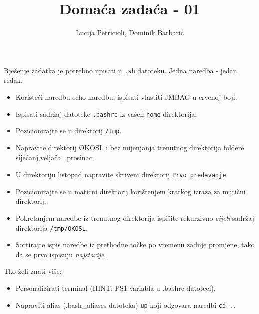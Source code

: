 \documentclass[12pt,a4paper]{article}
\newcommand{\shell}[1]{\texttt{#1}}
\begin{document}
	\title{Domaća zadaća - 01}
	\author{Lucija Petricioli, Dominik Barbarić}
	\maketitle
	Rješenje zadatka je potrebno upisati u \shell{.sh} datoteku. Jedna naredba - jedan redak.
	\begin{itemize}
    \item Koristeći naredbu echo naredbu, ispisati vlastiti JMBAG u crvenoj boji.
    \item Ispisati sadržaj datoteke \shell{.bashrc} iz vašeh \shell{home} direktorija.
		\item Pozicionirajte se u direktorij \shell{/tmp}.
		\item Napravite direktorij OKOSL i bez mijenjanja trenutnog direktorija foldere siječanj,veljača...prosinac.
		\item U direktoriju listopad napravite skriveni direktorij \shell{Prvo predavanje}.
		\item Pozicionirajte se u matični direktorij korištenjem kratkog izraza za matični direktorij.
		\item Pokretanjem naredbe iz trenutnog direktorija ispišite rekurzivno \textit{cijeli} sadržaj direktorija \shell{/tmp/OKOSL}.
		\item Sortirajte ispis naredbe iz prethodne točke po vremenu zadnje promjene, tako da se prvo ispisuju \textit{najstarije}.
	\end{itemize}
  Tko želi znati više:
	\begin{itemize}
    \item Personalizirati terminal (HINT: PS1 variabla u .bashrc datoteci).
    \item Napraviti alias (.bash\_aliases datoteka) \shell{up} koji odgovara naredbi \shell{cd ..}
	\end{itemize}
\end{document}

